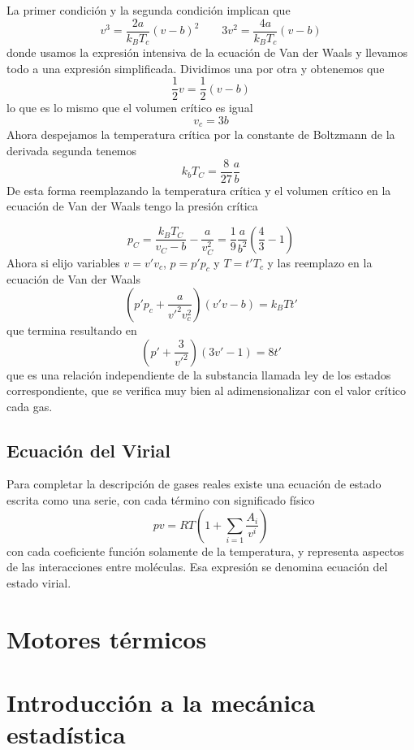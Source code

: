 La primer condición y la segunda condición implican que
\begin{equation}
    v^3 = \frac{2 a}{k_B T_c} (v - b)^2 \qquad 3 v^2 = \frac{4 a}{k_B T_c} (v - b)
\end{equation}
donde usamos la expresión intensiva de la ecuación de Van der Waals y llevamos todo a una expresión simplificada.
Dividimos una por otra y obtenemos que
\[ \frac{1}{2} v = \frac{1}{2} (v - b) \]
lo que es lo mismo que el volumen crítico es igual
\begin{equation}
    v_c = 3 b
\end{equation}
Ahora despejamos la temperatura crítica por la constante de Boltzmann de la derivada segunda tenemos
\begin{equation}
    k_b T_C = \frac{8}{27} \frac{a}{b}
\end{equation}
De esta forma reemplazando la temperatura crítica y el volumen crítico en la ecuación de Van der Waals tengo la presión crítica

\begin{equation}
    p_C = \frac{k_B T_C}{v_C - b}  - \frac{a}{v^2_C} = \frac{1}{9} \frac{a}{b^2} \left(\frac{4}{3} - 1\right)
\end{equation}
Ahora si elijo variables $v = v' v_c$, $p = p' p_c$ y $T = t' T_c$ y las reemplazo en la ecuación de Van der Waals
\[ \left(p' p_c + \frac{a}{v'^2 v^2_c}\right) (v' v - b) = k_B T t' \] 
que termina resultando en
\begin{equation}
    \left(p' + \frac{3}{v'^2}\right)(3 v' - 1) = 8 t'
    \label{eq:gases_estados_correspondientes}
\end{equation}
que es una relación independiente de la substancia llamada ley de los estados correspondiente, que se verifica muy bien al adimensionalizar con el valor crítico cada gas.

\subsection{Ecuación del Virial}

Para completar la descripción de gases reales existe una ecuación de estado escrita como una serie, con cada término con significado físico
\begin{equation}
p v = RT \left( 1 + \sum_{i = 1} \frac{A_i}{v^i}\right)
\end{equation}
con cada coeficiente función solamente de la temperatura, y representa aspectos de las interacciones entre moléculas.
Esa expresión se denomina ecuación del estado virial.

\section{Motores térmicos}

\section{Introducción a la mecánica estadística}
